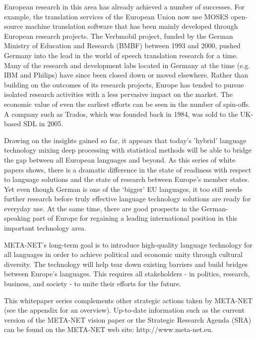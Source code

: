 \documentclass[]{../metanetpaper}
\begin{document}
\begin{Parallel}[c]{80mm}{80mm}
{    European research in this area has already achieved a number of successes. For example, the translation services of the European Union now use MOSES open-source machine translation software that has been mainly developed through European research projects. The Verbmobil project, funded by the German Ministry of Education and Research (BMBF) between 1993 and 2000, pushed Germany into the lead in the world of speech translation research for a time. Many of the research and development labs located in Germany at the time (e.g. IBM and Philips) have since been closed down or moved elsewhere. Rather than building on the outcomes of its research projects, Europe has tended to pursue isolated research activities with a less pervasive impact on the market. The economic value of even the earliest efforts can be seen in the number of spin-offs. A company such as Trados, which was founded back in 1984, was sold to the UK-based SDL in 2005.


    Drawing on the insights gained so far, it appears that today’s 'hybrid' language technology mixing deep processing with statistical methods will be able to bridge the gap between all European languages and beyond. As this series of white papers shows, there is a dramatic difference in the state of readiness with respect to language solutions and the state of research between Europe’s member states. Yet even though German is one of the ‘bigger’ EU languages, it too still needs further research before truly effective language technology solutions are ready for everyday use. At the same time, there are good prospects in the German-speaking part of Europe for regaining a leading international position in this important technology area. 

    META-NET’s long-term goal is to introduce high-quality language technology for all languages in order to achieve political and economic unity through cultural diversity. The technology will help tear down existing barriers and build bridges between Europe’s languages. This requires all stakeholders - in politics, research, business, and society - to unite their efforts for the future.

    This whitepaper series complements other strategic actions taken by META-NET (see the appendix for an overview). Up-to-date information such as the current version of the META-NET vision paper\cite{Meta1} or the Strategic Research Agenda (SRA) can be found on the META-NET web site: http://www.meta-net.eu.
  }
  

\end{Parallel}
\end{document}
